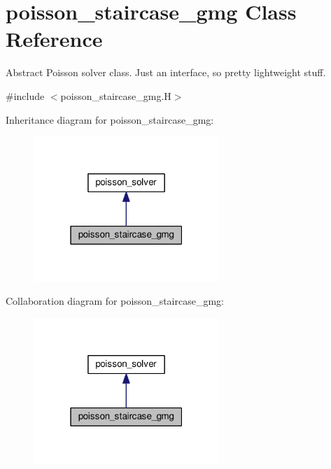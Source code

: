 \hypertarget{classpoisson__staircase__gmg}{}\section{poisson\+\_\+staircase\+\_\+gmg Class Reference}
\label{classpoisson__staircase__gmg}


Abstract Poisson solver class. Just an interface, so pretty lightweight stuff.  




{\ttfamily \#include $<$poisson\+\_\+staircase\+\_\+gmg.\+H$>$}



Inheritance diagram for poisson\+\_\+staircase\+\_\+gmg\+:\nopagebreak
\begin{figure}[H]
\begin{center}
\leavevmode
\includegraphics[width=199pt]{classpoisson__staircase__gmg__inherit__graph}
\end{center}
\end{figure}


Collaboration diagram for poisson\+\_\+staircase\+\_\+gmg\+:\nopagebreak
\begin{figure}[H]
\begin{center}
\leavevmode
\includegraphics[width=199pt]{classpoisson__staircase__gmg__coll__graph}
\end{center}
\end{figure}

